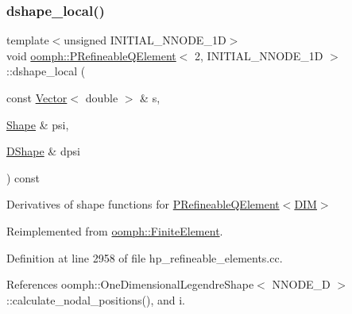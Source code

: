 \subsubsection{\texorpdfstring{dshape\+\_\+local()}{dshape\_local()}}
{\footnotesize\ttfamily template$<$unsigned I\+N\+I\+T\+I\+A\+L\+\_\+\+N\+N\+O\+D\+E\+\_\+1D$>$ \\
void \hyperlink{classoomph_1_1PRefineableQElement}{oomph\+::\+P\+Refineable\+Q\+Element}$<$ 2, I\+N\+I\+T\+I\+A\+L\+\_\+\+N\+N\+O\+D\+E\+\_\+1D $>$\+::dshape\+\_\+local (\begin{DoxyParamCaption}\item[{const \hyperlink{classoomph_1_1Vector}{Vector}$<$ double $>$ \&}]{s,  }\item[{\hyperlink{classoomph_1_1Shape}{Shape} \&}]{psi,  }\item[{\hyperlink{classoomph_1_1DShape}{D\+Shape} \&}]{dpsi }\end{DoxyParamCaption}) const\hspace{0.3cm}{\ttfamily [virtual]}}



Derivatives of shape functions for \hyperlink{classoomph_1_1PRefineableQElement}{P\+Refineable\+Q\+Element$<$\+D\+I\+M$>$} 



Reimplemented from \hyperlink{classoomph_1_1FiniteElement_a9db1456b827131c21a991ac9fedf4b0c}{oomph\+::\+Finite\+Element}.



Definition at line 2958 of file hp\+\_\+refineable\+\_\+elements.\+cc.



References oomph\+::\+One\+Dimensional\+Legendre\+Shape$<$ N\+N\+O\+D\+E\+\_\+D $>$\+::calculate\+\_\+nodal\+\_\+positions(), and i.

\mbox{\label{classoomph_1_1PRefineableQElement_3_012_00_01INITIAL__NNODE__1D_01_4_a73d08f7b72685de1d8dd9ac30b8ddfec}} 
